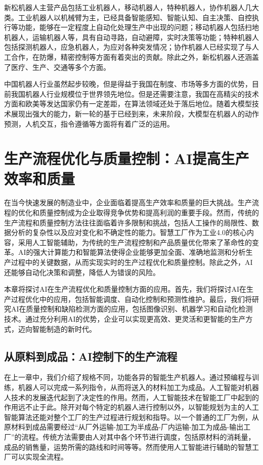 新松机器人主营产品包括工业机器人，移动机器人，特种机器人，协作机器人几大类。工业机器人以机械臂为主，已经具备智能感知、智能认知、自主决策、自控执行等功能，能够在一定程度上自动化处理生产中出现的问题；移动机器人包括扫地机器人，运输机器人等，具有自动寻路，自动避障，实时决策等功能；特种机器人包括探测机器人，应急机器人，为应对各种突发情况；协作机器人已经实现了与人工合作，在防爆，精密控制等方面有着突出的贡献。除此之外，新松机器人还涵盖了医疗、生产、交通等多个方面。

中国机器人行业虽然起步较晚，但是得益于我国在制度、市场等多方面的优势，目前我国机器人行业规模位于世界领先地位。但是还需要注意，我国在高精尖的技术方面和欧美等发达国家仍有一定差距，在算法领域还处于落后地位。随着大模型技术展现出强大的能力，新一轮的基于已经到来，未来阶段，大模型在机器人的动作预测，人机交互，指令遵循等方面将有着广泛的运用。

\section[生产流程优化与质量控制]{生产流程优化与质量控制：AI提高生产效率和质量}
在当今快速发展的制造业中，企业面临着提高生产效率和质量的巨大挑战。生产流程的优化和质量控制成为企业取得竞争优势和提高利润的重要手段。然而，传统的生产流程和质量控制方法往往面临着许多限制和挑战，包括人工操作的局限性、数据分析的复杂性以及应对变化和不确定性的能力。智慧工厂作为工业4.0的核心内容，采用人工智能辅助，为传统的生产流程控制和产品质量优化带来了革命性的变革。AI的强大计算能力和智能算法使得企业能够更加全面、准确地监测和分析生产过程中的关键数据，从而实现实时的生产过程优化和质量控制。除此之外，AI还能够自动化决策和调整，降低人为错误的风险。

本章将探讨AI在生产流程优化和质量控制方面的应用。首先，我们将探讨AI在生产过程优化中的应用，包括智能调度、自动化控制和预测性维护。最后，我们将研究AI在质量控制和缺陷检测方面的应用，包括图像识别、机器学习和自动化检测技术。通过充分利用AI的优势，企业可以实现更高效、更灵活和更智能的生产方式，迈向智能制造的新时代。

\subsection{从原料到成品：AI控制下的生产流程}
在上一章中，我们介绍了规格不同，功能各异的智能生产机器人。通过预编程与训练，机器人可以完成一系列指令，从而将送入的材料加工为成品。人工智能对机器人技术的发展迭代起到了决定性的作用。然而，人工智能技术在智能工厂中起到的作用远不止于此。除开对每个特定的机器人进行控制以外，以智能规划为主的人工智能算法还能对整个工厂的生产过程进行规划和指导。以一个普通的工厂为例，从原材料到成品需要经过“从厂外运输-加工为半成品-厂内运输-加工为成品-输出工厂”的流程。传统方法需要由人对其中各个环节进行调度，包括原材料的消耗量，成品的销售量，运势所需的路线和时间等等。然而使用人工智能进行辅助的智慧工厂可以实现全流程。


